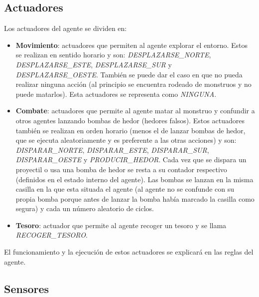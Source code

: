 \subsection{Actuadores}

Los actuadores del agente se dividen en:

\begin{itemize}
    \item \textbf{Movimiento}: actuadores que permiten al agente explorar el entorno. Estos se realizan en sentido horario y son: \emph{DESPLAZARSE\_NORTE}, \emph{DESPLAZARSE\_ESTE}, \emph{DESPLAZARSE\_SUR} y \emph{DESPLAZARSE\_OESTE}. También se puede dar el caso en que no pueda realizar ninguna acción (al principio se encuentra rodeado de monstruos y no puede matarlos). Esta actuadores se representa como \emph{NINGUNA}.
    
    \item \textbf{Combate}: actuadores que permite al agente matar al monstruo y confundir a otros agentes lanzando bombas de hedor (hedores falsos). Estos actuadores también se realizan en orden horario (menos el de lanzar bombas de hedor, que se ejecuta aleatoriamente y es preferente a las otras acciones) y son: \emph{DISPARAR\_NORTE}, \emph{DISPARAR\_ESTE}, \emph{DISPARAR\_SUR}, \emph{DISPARAR\_OESTE} y \emph{PRODUCIR\_HEDOR}. Cada vez que se dispara un proyectil o usa una bomba de hedor se resta a su contador respectivo (definidos en el estado interno del agente). Las bombas se lanzan en la misma casilla en la que esta situada el agente (al agente no se confunde con su propia bomba porque antes de lanzar la bomba había marcado la casilla como segura) y cada un número aleatorio de ciclos.
    
    \item \textbf{Tesoro}: actuador que permite al agente recoger un tesoro y se llama \emph{RECOGER\_TESORO}.
\end{itemize}

El funcionamiento y la ejecución de estos actuadores se explicará en las reglas del agente.

\subsection{Sensores}


